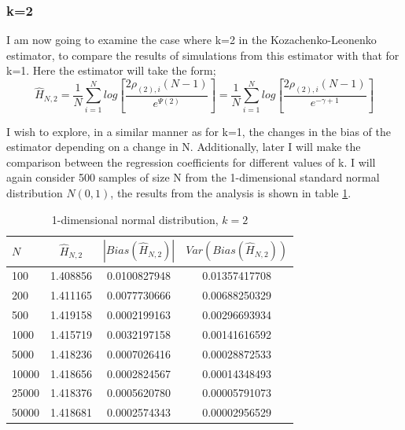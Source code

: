 \documentclass{article}
\begin{document}
\subsubsection{k=2} \label{N_k=2}
I am now going to examine the case where k=2 in the Kozachenko-Leonenko estimator, to compare the results of simulations from this estimator with that for k=1. Here the estimator will take the form;
\begin{equation}
\hat{H}_{N, 2} = \frac{1}{N} \sum_{i=1}^{N} log \left[ \frac{2\rho_{(2),i} (N-1)}{e^{\Psi(2)}} \right] = \frac{1}{N} \sum_{i=1}^{N} log \left[ \frac{2\rho_{(2),i} (N-1)}{e^{-\gamma + 1}} \right] \nonumber
\end{equation}

I wish to explore, in a similar manner as for k=1, the changes in the bias of the estimator depending on a change in N. Additionally, later I will make the comparison between the regression coefficients for different values of k. I will again consider 500 samples of size N from the 1-dimensional standard normal distribution $N(0, 1)$, the results from the analysis is shown in table \ref{normal_k=2_table}.

\begin{table}
\caption{1-dimensional normal distribution, $k=2$} \label{normal_k=2_table}
\begin{center}
\begin{tabular}{| l | c c c|} 
\toprule
$N$ & $\hat{H}_{N, 2}$ & $|Bias(\hat{H}_{N, 2})|$ & $Var(Bias(\hat{H}_{N, 2}))$ \\
\midrule[1pt]
100     & 1.408856     & 0.0100827948     & 0.01357417708  \\
200     & 1.411165     & 0.0077730666     & 0.00688250329  \\
500     & 1.419158     & 0.0002199163     & 0.00296693934  \\
1000    & 1.415719     & 0.0032197158     & 0.00141616592  \\
5000    & 1.418236     & 0.0007026416     & 0.00028872533  \\
10000   & 1.418656     & 0.0002824567     & 0.00014348493  \\
25000   & 1.418376     & 0.0005620780     & 0.00005791073  \\
50000   & 1.418681     & 0.0002574343     & 0.00002956529  \\
\hline
\end{tabular}
\end{center}
\end{table}
\end{document}
